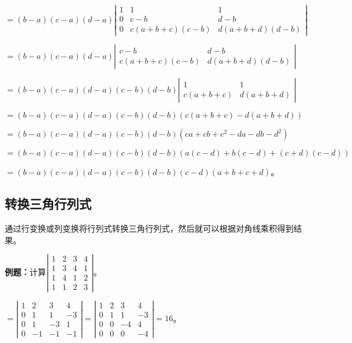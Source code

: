 \documentclass[UTF8, 12pt]{ctexart}
\begin{document}
$=(b-a)(c-a)(d-a)\left|\begin{array}{ccc}
    1 & 1 & 1 \\
    0 & c-b & d-b \\
    0 & c(a+b+c)(c-b) & d(a+b+d)(d-b)
\end{array}\right|$

$=(b-a)(c-a)(d-a)\left|\begin{array}{cc}
    c-b & d-b \\
    c(a+b+c)(c-b) & d(a+b+d)(d-b)
\end{array}\right|$

$=(b-a)(c-a)(d-a)(c-b)(d-b)\left|\begin{array}{cc}
    1 & 1 \\
    c(a+b+c) & d(a+b+d)
\end{array}\right|$

$=(b-a)(c-a)(d-a)(c-b)(d-b)(c(a+b+c)-d(a+b+d))$

$=(b-a)(c-a)(d-a)(c-b)(d-b)(ca+cb+c^2-da-db-d^2)$

$=(b-a)(c-a)(d-a)(c-b)(d-b)(a(c-d)+b(c-d)+(c+d)(c-d))$

$=(b-a)(c-a)(d-a)(c-b)(d-b)(c-d)(a+b+c+d)$。

\subsection{转换三角行列式}

通过行变换或列变换将行列式转换三角行列式，然后就可以根据对角线乘积得到结果。

\textbf{例题：}计算$\left|\begin{array}{cccc} 
    1 & 2 & 3 & 4 \\
    1 & 3 & 4 & 1 \\
    1 & 4 & 1 & 2 \\
    1 & 1 & 2 & 3
\end{array}\right|$。

$=\left|\begin{array}{cccc} 
    1 & 2 & 3 & 4 \\
    0 & 1 & 1 & -3 \\
    0 & 1 & -3 & 1 \\
    0 & -1 & -1 & -1
\end{array}\right|
=\left|\begin{array}{cccc} 
    1 & 2 & 3 & 4 \\
    0 & 1 & 1 & -3 \\
    0 & 0 & -4 & 4 \\
    0 & 0 & 0 & -4
\end{array}\right|=16$。
\end{document}
